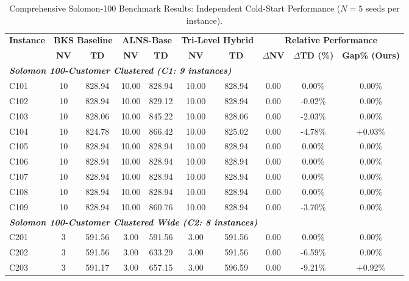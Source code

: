 \documentclass{article}
\begin{document}
\begin{table}[!htbp]
\caption{Comprehensive Solomon-100 Benchmark Results: Independent Cold-Start Performance ($N=5$ seeds per instance).}
\label{tab:full_solomon_results}
\centering
\scriptsize
\setlength{\tabcolsep}{3.0pt}
\begin{tabular*}{\textwidth}{@{\extracolsep{\fill}} l cc cc cc ccc @{}}
\toprule
\multirow{2}{*}{\textbf{Instance}} & \multicolumn{2}{c}{\textbf{BKS Baseline}} & \multicolumn{2}{c}{\textbf{ALNS-Base}} & \multicolumn{2}{c}{\textbf{Tri-Level Hybrid}} & \multicolumn{3}{c}{\textbf{Relative Performance}} \\
\cmidrule(lr){2-3} \cmidrule(lr){4-5} \cmidrule(lr){6-7} \cmidrule(lr){8-10}
 & \textbf{NV} & \textbf{TD} & \textbf{NV} & \textbf{TD} & \textbf{NV} & \textbf{TD} & \textbf{$\Delta$NV} & \textbf{$\Delta$TD (\%)} & \textbf{Gap\% (Ours)} \\
\midrule
\multicolumn{10}{l}{\textit{\textbf{Solomon 100-Customer Clustered (C1: 9 instances)}}} \\
C101 & 10 & 828.94 & 10.00 & 828.94 & 10.00 & 828.94 & 0.00 & 0.00\% & 0.00\% \\
C102 & 10 & 828.94 & 10.00 & 829.12 & 10.00 & 828.94 & 0.00 & -0.02\% & 0.00\% \\
C103 & 10 & 828.06 & 10.00 & 845.22 & 10.00 & 828.06 & 0.00 & -2.03\% & 0.00\% \\
C104 & 10 & 824.78 & 10.00 & 866.42 & 10.00 & 825.02 & 0.00 & -4.78\% & +0.03\% \\
C105 & 10 & 828.94 & 10.00 & 828.94 & 10.00 & 828.94 & 0.00 & 0.00\% & 0.00\% \\
C106 & 10 & 828.94 & 10.00 & 828.94 & 10.00 & 828.94 & 0.00 & 0.00\% & 0.00\% \\
C107 & 10 & 828.94 & 10.00 & 828.94 & 10.00 & 828.94 & 0.00 & 0.00\% & 0.00\% \\
C108 & 10 & 828.94 & 10.00 & 828.94 & 10.00 & 828.94 & 0.00 & 0.00\% & 0.00\% \\
C109 & 10 & 828.94 & 10.00 & 860.76 & 10.00 & 828.94 & 0.00 & -3.70\% & 0.00\% \\
\midrule
\multicolumn{10}{l}{\textit{\textbf{Solomon 100-Customer Clustered Wide (C2: 8 instances)}}} \\
C201 & 3 & 591.56 & 3.00 & 591.56 & 3.00 & 591.56 & 0.00 & 0.00\% & 0.00\% \\
C202 & 3 & 591.56 & 3.00 & 633.29 & 3.00 & 591.56 & 0.00 & -6.59\% & 0.00\% \\
C203 & 3 & 591.17 & 3.00 & 657.15 & 3.00 & 596.59 & 0.00 & -9.21\% & +0.92\% \\

\end{tabular*}
\end{table}
\end{document}
